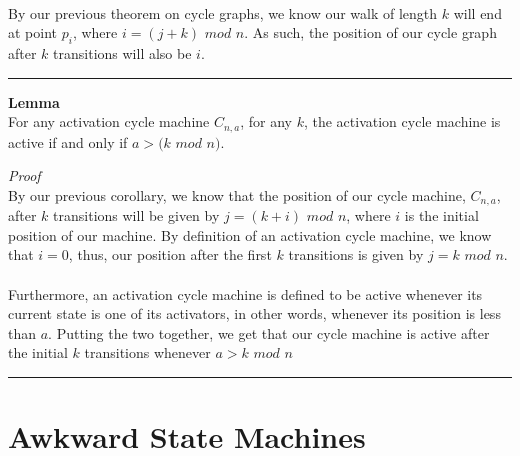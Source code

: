 \documentclass[a4paper,12pt]{article}
\begin{document}
\\
By our previous theorem on cycle graphs, we know our walk of length $k$ will end at point $p_i$, where $i = (j + k)$ $mod$ $n$. As such, the position of our cycle graph after $k$ transitions will also be $i$.
\begin{center}
\noindent\rule{8cm}{0.4pt}
\end{center}
\noindent
\begin{tcolorbox}
\textbf{Lemma}\\
For any activation cycle machine $C_{n,a}$, for any $k$, the activation cycle machine is active if and only if $a > (k$ $mod$ $n)$.
\end{tcolorbox}
\noindent
\textit{Proof}\\
By our previous corollary, we know that the position of our cycle machine, $C_{n,a}$, after $k$ transitions will be given by $j =(k + i)$ $mod$ $n$, where $i$ is the initial position of our machine. By definition of an activation cycle machine, we know that $i = 0$, thus, our position after the first $k$ transitions is given by $j = k$ $mod$ $n$.\\
\\
Furthermore, an activation cycle machine is defined to be active whenever its current state is one of its activators, in other words, whenever its position is less than $a$. Putting the two together, we get that our cycle machine is active after the initial $k$ transitions whenever $a > k$ $mod$ $n$
\begin{center}
\noindent\rule{8cm}{0.4pt}
\end{center}
  
\section{Awkward State Machines}
\end{document}
